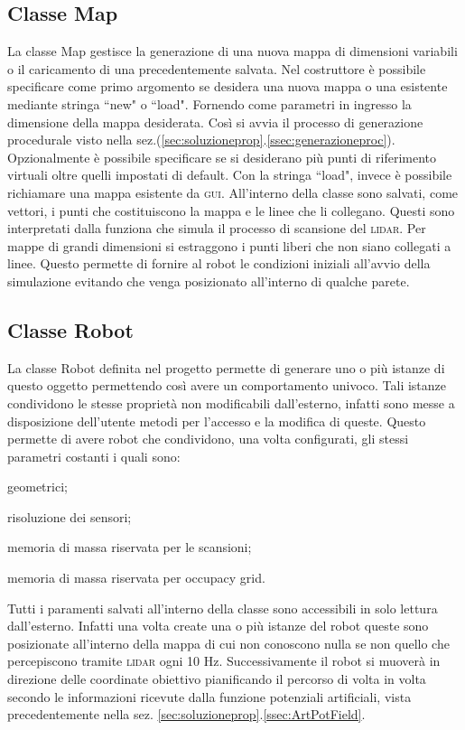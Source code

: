 \subsection{Classe Map}
\label{ssec:ClassMap}
La classe Map gestisce la generazione di una nuova mappa di dimensioni variabili
o il caricamento di una precedentemente salvata. Nel costruttore è possibile
specificare come primo argomento se desidera una nuova mappa o una esistente
mediante stringa ``new" o ``load".
Fornendo come parametri in ingresso la dimensione della mappa desiderata.
Così si avvia il processo di generazione procedurale visto
nella sez.(\ref{sec:soluzioneprop}.\ref{ssec:generazioneproc}). 
Opzionalmente è possibile specificare se si desiderano più punti di riferimento 
virtuali oltre quelli impostati di default.
Con la stringa ``load", invece è possibile richiamare una mappa esistente da
\textsc{gui}.
All'interno della classe sono salvati, come vettori, i punti che costituiscono
la mappa e le linee che li collegano. Questi sono interpretati dalla funziona
che simula il processo di scansione del \textsc{lidar}.
Per mappe di grandi dimensioni si estraggono i punti liberi che non siano
collegati a linee. Questo permette di fornire al robot le condizioni iniziali
all'avvio della simulazione evitando che venga posizionato all'interno di
qualche parete.

\subsection{Classe Robot}
\label{ssec:ClassRobot}
La classe Robot definita nel progetto permette di generare uno o più istanze di
questo oggetto permettendo così avere un comportamento univoco.
Tali istanze condividono le stesse proprietà non modificabili dall'esterno,
infatti sono messe a disposizione dell'utente metodi per l'accesso e la
modifica di queste.
Questo permette di avere robot che condividono, una volta configurati, gli
stessi parametri costanti i quali sono:
\begin{enumerate*}[label={\alph*)},font={\bfseries}]
	\item geometrici;
	\item risoluzione dei sensori;
	\item memoria di massa riservata per le scansioni;
	\item memoria di massa riservata per occupacy grid.
\end{enumerate*}
Tutti i paramenti salvati all'interno della classe sono accessibili in solo
lettura dall'esterno.
Infatti una volta create una o più istanze del robot queste sono posizionate
all'interno della mappa di cui non conoscono nulla se non quello che
percepiscono tramite \textsc{lidar} ogni 10 \si{\hertz}. Successivamente il
robot si muoverà in direzione delle coordinate obiettivo pianificando il
percorso di volta in volta secondo le informazioni ricevute dalla funzione
potenziali artificiali, vista precedentemente nella
sez. \ref{sec:soluzioneprop}.\ref{ssec:ArtPotField}.

